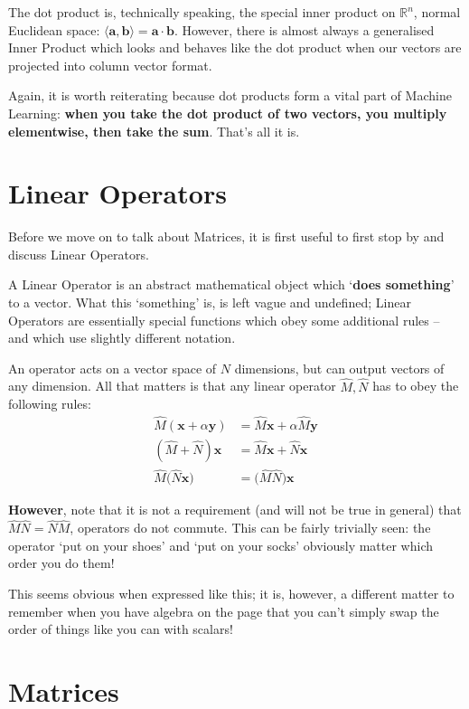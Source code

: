 \documentclass[a4paper,openany,11pt]{book}
\renewcommand\vec[1]{\boldsymbol{\mathbf{#1}}}
\begin{document}
					The dot product is, technically speaking, the special inner product on $\mathbb{R}^n$, normal Euclidean space: $\langle \vec{a}, \vec{b} \rangle = \vec{a}\cdot\vec{b}$. However, there is almost always a generalised Inner Product which looks and behaves like the dot product when our vectors are projected into column vector format. 

					Again, it is worth reiterating because dot products form a vital part of Machine Learning: \textbf{when you take the dot product of two vectors, you multiply elementwise, then take the sum}. That's all it is.
			\section{Linear Operators}

				Before we move on to talk about Matrices, it is first useful to first stop by and discuss Linear Operators. 

				A Linear Operator is an abstract mathematical object which `\textbf{does something}' to a vector. What this  `something' is, is left vague and undefined; Linear Operators are essentially special functions which obey some additional rules -- and which use slightly different notation. 

				An operator acts on a vector space of $N$ dimensions, but can output vectors of any dimension. 	All that matters is that any linear operator $\hat{M},\hat{N}$ has to obey the following rules:
				\begin{align}
					\hat{M} (\vec{x} + \alpha \vec{y}) & = \hat{M} \vec{x} + \alpha \hat{M}\vec{y} 
					\\
					(\hat{M} + \hat{N})\vec{x} & = \hat{M}\vec{x} + \hat{N} \vec{x}
					\\
					\hat{M} \Big( \hat{N} \vec{x}\Big) & = \Big( \hat{M} \hat{N} \Big) \vec{x}
				\end{align}
				
				\textbf{However}, note that it is not a requirement (and will not be true in general) that $\hat{M}\hat{N} = \hat{N}\hat{M}$, operators do not commute. This can be fairly trivially seen: the operator `put on your shoes' and `put on your socks' obviously matter which order you do them!

				This seems obvious when expressed like this; it is, however, a different matter to remember when you have algebra on the page that you can't simply swap the order of things like you can with scalars!

			\section{Matrices} \label{S:Matrices}
\end{document}
